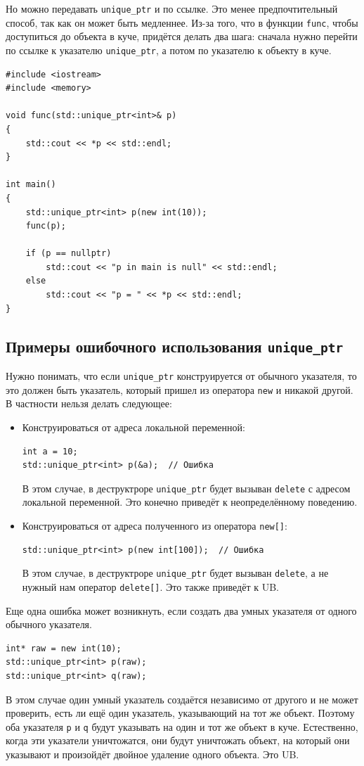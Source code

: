 \documentclass{article}
\begin{document}
\newpage
Но можно передавать \texttt{unique\_ptr} и по ссылке. Это менее предпочтительный способ, так как он может быть медленнее. Из-за того, что в функции \texttt{func}, чтобы доступиться до объекта в куче, придётся делать два шага: сначала нужно перейти по ссылке к указателю \texttt{unique\_ptr}, а потом по указателю к объекту в куче.
\begin{lstlisting}
#include <iostream>
#include <memory>

void func(std::unique_ptr<int>& p)
{
	std::cout << *p << std::endl;
}

int main()
{
	std::unique_ptr<int> p(new int(10));
	func(p);
	
	if (p == nullptr)
		std::cout << "p in main is null" << std::endl;
	else
		std::cout << "p = " << *p << std::endl;
}
\end{lstlisting}

\subsection*{Примеры ошибочного использования \texttt{unique\_ptr}}
Нужно понимать, что если \texttt{unique\_ptr} конструируется от обычного указателя, то это должен быть указатель, который пришел из оператора \texttt{new} и никакой другой. В частности нельзя делать следующее:
\begin{itemize}
\item Конструироваться от адреса локальной переменной:
\begin{lstlisting}
int a = 10;
std::unique_ptr<int> p(&a);  // Ошибка
\end{lstlisting}
В этом случае, в деструктроре \texttt{unique\_ptr} будет вызыван \texttt{delete} с адресом локальной переменной. Это конечно приведёт к неопределённому поведению.

\item Конструироваться от адреса полученного из оператора \texttt{new[]}:
\begin{lstlisting}
std::unique_ptr<int> p(new int[100]);  // Ошибка
\end{lstlisting}
В этом случае, в деструктроре \texttt{unique\_ptr} будет вызыван \texttt{delete}, а не нужный нам оператор \texttt{delete[]}. Это также приведёт к UB.
\end{itemize}
Еще одна ошибка может возникнуть, если создать два умных указателя от одного обычного указателя.
\begin{lstlisting}
int* raw = new int(10);
std::unique_ptr<int> p(raw);
std::unique_ptr<int> q(raw);
\end{lstlisting}
В этом случае один умный указатель создаётся независимо от другого и не может проверить, есть ли ещё один указатель, указывающий на тот же объект. Поэтому оба указателя \texttt{p} и \texttt{q} будут указывать на один и тот же объект в куче. Естественно, когда эти указатели уничтожатся, они будут уничтожать объект, на который они указывают и произойдёт двойное удаление одного объекта. Это UB.
\end{document}
